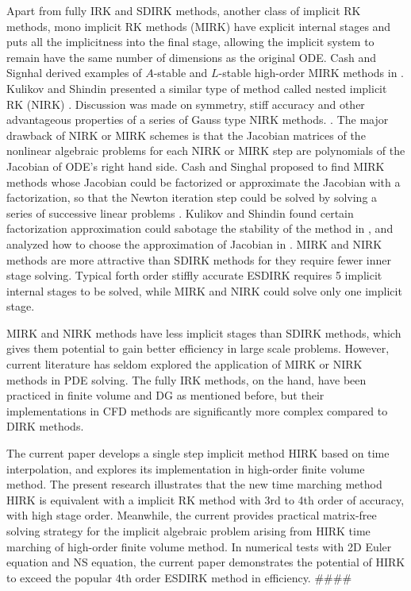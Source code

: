 \documentclass[preprint,12pt]{elsarticle}
\begin{document}
Apart from fully IRK and SDIRK methods,
another class of implicit RK methods,
mono implicit RK methods (MIRK)
\cite{cash1975classMIRKOrig}
have explicit internal stages and
puts all the implicitness into the final
stage, allowing the implicit system to
remain have the same number of dimensions
as the original ODE.
Cash and Signhal derived examples of
$A$-stable and $L$-stable high-order
MIRK methods in
\cite{cash1977clasMIRK1,cash1982monoMIRK2}.
Kulikov and Shindin presented a similar type
of method called nested implicit RK (NIRK)
\cite{kulikov2006familyNIRKOrig}.
Discussion was made on symmetry, stiff accuracy and
other advantageous properties of a series of Gauss type
NIRK methods.
\cite{kulikov2009adaptive}.
The major drawback of NIRK or MIRK schemes is that
the Jacobian matrices of the nonlinear algebraic problems
for each NIRK or MIRK step are
polynomials of the Jacobian of ODE's right hand side.
Cash and Singhal proposed to find MIRK methods whose
Jacobian could be factorized or approximate the Jacobian
with a factorization,
so that the Newton iteration
step could be solved by solving a series of successive linear
problems \cite{cash1982monoMIRK2}.
Kulikov and Shindin found certain factorization
approximation could sabotage the stability of
the method in
\cite{kulikov2009adaptive},
and analyzed how to choose the approximation of
Jacobian in
\cite{kulikov2007asymptotic}.
MIRK and NIRK methods are more attractive than SDIRK methods
for they require fewer inner stage solving.
Typical forth order
stiffly accurate ESDIRK requires 5 implicit internal stages to be
solved,
while MIRK and NIRK could
solve only one implicit stage.


MIRK and NIRK methods have less
implicit stages than SDIRK methods,
which gives them potential to gain better efficiency in
large scale problems.
However, current literature has seldom explored
the application of MIRK or NIRK methods in
PDE solving.
The fully IRK methods, on the hand,
have been practiced in
finite volume \cite{jameson2017evaluation} and
DG \cite{pazner2017stage}
as mentioned before,
but their implementations
in CFD methods are significantly more
complex compared to DIRK methods.

The current paper develops a single step implicit method HIRK
based on time interpolation,
and explores its implementation in high-order finite volume method.
The present research illustrates that the new time marching
method HIRK is equivalent with a implicit RK method with 3rd to 4th
order of accuracy, with high stage order.
Meanwhile, the current provides practical matrix-free
solving strategy for the implicit
algebraic problem
arising from HIRK time marching of high-order finite volume method.
In numerical tests with 2D Euler equation and NS equation,
the current paper demonstrates the potential of HIRK
to exceed the popular 4th order ESDIRK method in efficiency.
\#\#\#\#
\end{document}
